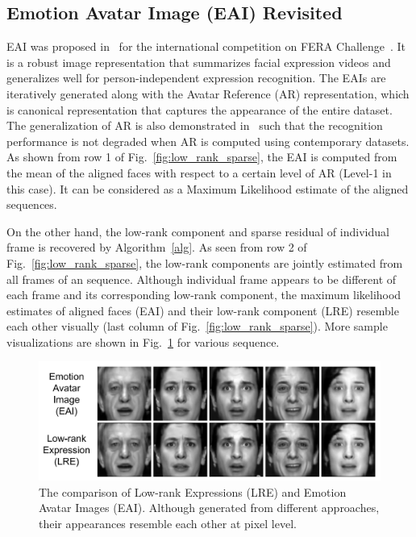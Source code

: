 \documentclass[journal]{IEEEtran}
\begin{document}
\subsection{Emotion Avatar Image (EAI) Revisited\label{sec:eai}}

EAI was proposed in~\cite{Yang_SMCB12} for the international competition on FERA Challenge~\cite{FERA11}. It is a robust image representation that summarizes facial expression videos and generalizes well for person-independent expression recognition. The EAIs are iteratively generated along with the Avatar Reference (AR) representation, which is canonical representation that captures the appearance of the entire dataset. The generalization of AR is also demonstrated in~\cite{Yang_SMCB12} such that the recognition performance is not degraded when AR is computed using contemporary datasets. As shown from row 1 of Fig.~\ref{fig:low_rank_sparse}, the EAI is computed from the mean of the aligned faces with respect to a certain level of AR (Level-1 in this case). It can be considered as a Maximum Likelihood estimate of the aligned sequences. 

On the other hand, the low-rank component and sparse residual of individual frame is recovered by Algorithm~\ref{alg}. As seen from row 2 of Fig.~\ref{fig:low_rank_sparse}, the low-rank components are jointly estimated from all frames of an sequence. Although individual frame appears to be different of each frame and its corresponding low-rank component, the maximum likelihood estimates of aligned faces (EAI) and their low-rank component (LRE) resemble each other visually (last column of Fig.~\ref{fig:low_rank_sparse}). More sample visualizations are shown in Fig.~\ref{fig:eai_lre_compare} for various sequence. 


\begin{figure}[htbp]
	\centering
		\includegraphics[width=\columnwidth]{pics/eai_lre_compare.png}
	\caption{The comparison of Low-rank Expressions (LRE) and Emotion Avatar Images (EAI). Although generated from different approaches, their appearances resemble each other at pixel level.}
	\label{fig:eai_lre_compare}
\end{figure}
\end{document}

